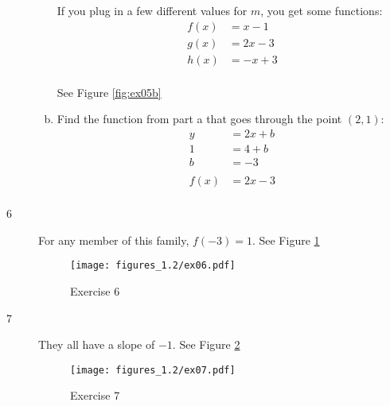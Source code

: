 \documentclass[letterpaper, landscape]{exam}
\begin{document}
\begin{description}
\begin{enumerate}[(a)]
            If you plug in a few different values for $m$, you get some
            functions:
            \begin{align*}
              f(x) &= x - 1 \\
              g(x) &= 2x - 3 \\
              h(x) &= -x + 3 \\
            \end{align*}

            See Figure \ref{fig:ex05b}

          \item Find the function from part a that goes through the point
            $(2, 1)$:
            \begin{align*}
              y &= 2x + b \\
              1 &= 4 + b \\
              b &= -3 \\
              \\
              f(x) &= 2x - 3 \\
            \end{align*}

        \end{enumerate}

      \item[6] For any member of this family, $f(-3) = 1$. 
        See Figure \ref{fig:ex06}

        \begin{figure}[H]
          \centering
          \texttt{[image: figures\_1.2/ex06.pdf]}
          \caption{Exercise 6}
          \label{fig:ex06}
        \end{figure}

      \item[7] They all have a slope of $-1$.
        See Figure \ref{fig:ex07}

        \begin{figure}[H]
          \centering
          \texttt{[image: figures\_1.2/ex07.pdf]}
          \caption{Exercise 7}
          \label{fig:ex07}
        \end{figure}



\end{description}
\end{document}
